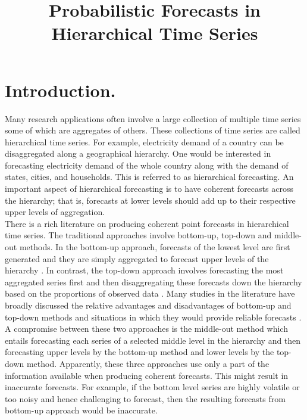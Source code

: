 \documentclass[a4paper, 11pt]{article}
\begin{document}
\title{Probabilistic Forecasts in Hierarchical Time Series}
\maketitle


\section{Introduction.}
Many research applications often involve a large collection of multiple time series some of which are aggregates of others.
These collections of time series are called hierarchical time series. For example, electricity demand of a country can be disaggregated along a geographical hierarchy. One would be interested in forecasting electricity demand of the whole country along with the demand of states, cities, and households. This is referred to as hierarchical forecasting. An important aspect of hierarchical forecasting is to have coherent forecasts across the hierarchy; that is, forecasts at lower levels should add up to their respective upper levels of aggregation.\\ 

\noindent
There is a rich literature on producing coherent point forecasts in hierarchical time series. The traditional approaches involve bottom-up, top-down and middle-out methods. In the bottom-up approach, forecasts of the lowest level are first generated and they are simply aggregated to forecast upper levels of the hierarchy \citep{Dunn1976}.  
In contrast, the top-down approach involves forecasting the most aggregated series first and then disaggregating these forecasts down the hierarchy based on the proportions of observed data \citep{Gross1990}. 
Many studies in the literature have broadly discussed the relative advantages and disadvantages of bottom-up and top-down methods and situations in which they would provide reliable forecasts \citep{Schwarzkopf1988,Kahn1998, Lapide1998,Fliedner2001}.
A compromise between these two approaches is the middle-out method which entails forecasting each series of a selected middle level in the hierarchy and then forecasting upper levels by the bottom-up method and lower levels by the top-down method. Apparently, these three approaches use only a part of the information available when producing coherent forecasts. This might result in inaccurate forecasts. For example, if the bottom level series are highly volatile or too noisy and hence challenging to forecast, then the resulting forecasts from bottom-up approach would be inaccurate.\\
\end{document}
